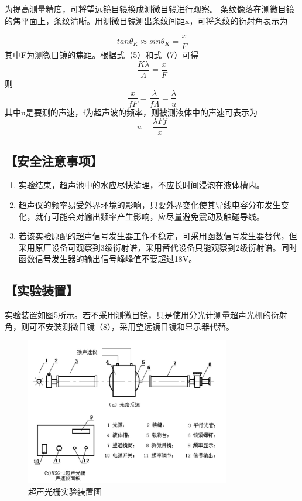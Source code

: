 \documentclass[12pt,a4paper,UTF8]{ctexart}
\begin{document}
为提高测量精度，可将望远镜目镜换成测微目镜进行观察。
条纹像落在测微目镜的焦平面上，条纹清晰。用测微目镜测出条纹间距x，可将条纹的衍射角表示为

\begin{equation}
	tan \theta_K\approx sin\theta_K=\frac{x}{F}
\end{equation}
其中F为测微目镜的焦距。根据式（5）和式（7）可得
\begin{equation}
	\frac{K\lambda}{\varLambda }=\frac{x}{F}
\end{equation}
则
\begin{equation}
	\frac{x}{fF}=\frac{\lambda}{f\varLambda}=\frac{\lambda}{u}
\end{equation}
其中u是要测的声速，f为超声波的频率，则被测液体中的声速可表示为
\begin{equation}
	u=\frac{\lambda F f}{x}
\end{equation}

\subsection*{【安全注意事项】}
    \begin{enumerate}
		\item 实验结束，超声池中的水应尽快清理，不应长时间浸泡在液体槽内。
		\item 超声仪的频率易受外界环境的影响，只要外界变化使其导线电容分布发生变化，就有可能会对输出频率产生影响，应尽量避免震动及触碰导线。
		\item 若该实验原配的超声信号发生器工作不稳定，可采用函数信号发生器替代，但采用原厂设备可观察到3级衍射谱，采用替代设备只能观察到2级衍射谱。同时函数信号发生器的输出信号峰峰值不要超过18V。
	\end{enumerate}

\subsection*{【实验装置】}
实验装置如图5所示。若不采用测微目镜，只是使用分光计测量超声光栅的衍射角，则可不安装测微目镜（8），采用望远镜目镜和显示器代替。
\begin{figure}[htbp]
	\centering
	\includegraphics[width=0.8\textwidth]{img//6.jpg}
	\caption{超声光栅实验装置图}
\end{figure}
\end{document}
